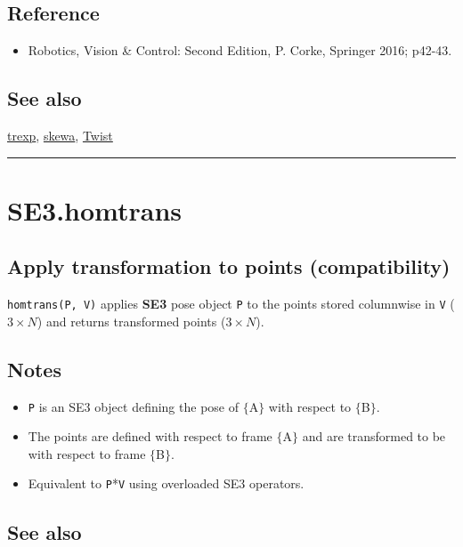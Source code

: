 \subsection*{Reference}
\begin{itemize}
  \item Robotics, Vision \& Control: Second Edition, P. Corke, Springer 2016; p42-43.
\end{itemize}

\subsection*{See also}


\hyperlink{trexp}{\color{blue} trexp}, \hyperlink{skewa}{\color{blue} skewa}, \hyperlink{Twist}{\color{blue} Twist}

\vspace{1.5ex}\hrule

\hypertarget{SE3.homtrans}{\section*{SE3.homtrans}}
\subsection*{Apply transformation to points (compatibility)}


\texttt{homtrans(P, V)} applies \textbf{\color{red} SE3} pose object \texttt{P} to the points stored columnwise in
\texttt{V} ($3 \times N$) and returns transformed points ($3 \times N$).


\subsection*{Notes}
\begin{itemize}
  \item \texttt{P} is an SE3 object defining the pose of $\{$A$\}$ with respect to $\{$B$\}$.
  \item The points are defined with respect to frame $\{$A$\}$ and are transformed to be     with respect to frame $\{$B$\}$.
  \item Equivalent to \texttt{P}*\texttt{V} using overloaded SE3 operators.
\end{itemize}

\subsection*{See also}


